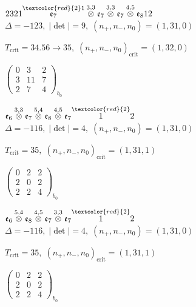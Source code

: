 \documentclass[10pt]{article}
\begin{document}
$2321\overset{\textcolor{red}{2}1}{\mathfrak{e}_7}\overset{3,3}{\otimes}\mathfrak{e}_7\overset{3,3}{\otimes}\mathfrak{e}_7\overset{4,5}{\otimes}\mathfrak{e}_812$ \quad $\Delta=-123,\; |\det|=9,\; (n_+,n_-,n_0)=(1,31,0)$

\hspace{1em}$T_{\text{crit}}=34.56 \to 35,\; (n_+,n_-,n_0)_{\text{crit}}=(1,32,0)$

\hspace{2em}$\left(\begin{smallmatrix}0 & 3 & 2 \\ 3 & 11 & 7 \\ 2 & 7 & 4\end{smallmatrix}\right)_{\!b_0}$

\smallskip

$\mathfrak{e}_6\overset{3,3}{\otimes}\mathfrak{e}_7\overset{5,4}{\otimes}\mathfrak{e}_8\overset{4,5}{\otimes}\mathfrak{e}_7\overset{\textcolor{red}{2}}{1}2$ \quad $\Delta=-116,\; |\det|=4,\; (n_+,n_-,n_0)=(1,31,0)$

\hspace{1em}$T_{\text{crit}}=35,\; (n_+,n_-,n_0)_{\text{crit}}=(1,31,1)$

\hspace{2em}$\left(\begin{smallmatrix}0 & 2 & 2 \\ 2 & 0 & 2 \\ 2 & 2 & 4\end{smallmatrix}\right)_{\!b_0}$

\smallskip

$\mathfrak{e}_6\overset{5,4}{\otimes}\mathfrak{e}_8\overset{4,5}{\otimes}\mathfrak{e}_7\overset{3,3}{\otimes}\mathfrak{e}_7\overset{\textcolor{red}{2}}{1}2$ \quad $\Delta=-116,\; |\det|=4,\; (n_+,n_-,n_0)=(1,31,0)$

\hspace{1em}$T_{\text{crit}}=35,\; (n_+,n_-,n_0)_{\text{crit}}=(1,31,1)$

\hspace{2em}$\left(\begin{smallmatrix}0 & 2 & 2 \\ 2 & 0 & 2 \\ 2 & 2 & 4\end{smallmatrix}\right)_{\!b_0}$
\end{document}
